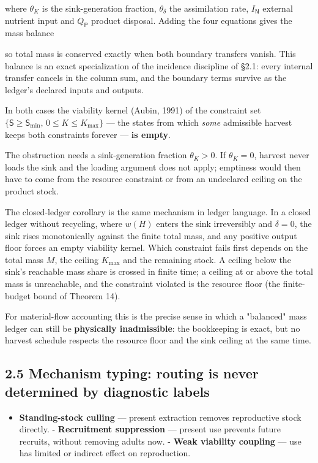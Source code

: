 \documentclass[11pt]{article}
\begin{document}
where \(\theta_K\) is the sink-generation fraction, \(\theta_\delta\) the assimilation rate, \(I_{\mathsf N}\) external nutrient input and \(Q_{\mathsf P}\) product disposal. Adding the four equations gives the mass balance

so total mass is conserved exactly when both boundary transfers vanish. This balance is an exact specialization of the incidence discipline of \S2.1: every internal transfer cancels in the column sum, and the boundary terms survive as the ledger's declared inputs and outputs.

In both cases the viability kernel (Aubin, 1991) of the constraint set \(\{\mathsf S\ge \mathsf S_{\min},\allowbreak{}\,\allowbreak{}0\le K\le K_{\max}\}\) --- the states from which \emph{some} admissible harvest keeps both constraints forever --- \textbf{is empty}.

The obstruction needs a sink-generation fraction \(\theta_K>0\). If \(\theta_K=0\), harvest never loads the sink and the loading argument does not apply; emptiness would then have to come from the resource constraint or from an undeclared ceiling on the product stock.

The closed-ledger corollary is the same mechanism in ledger language. In a closed ledger without recycling, where \(w(H)\) enters the sink irreversibly and \(\delta=0\), the sink rises monotonically against the finite total mass, and any positive output floor forces an empty viability kernel. Which constraint fails first depends on the total mass \(M\), the ceiling \(K_{\max}\) and the remaining stock. A ceiling below the sink's reachable mass share is crossed in finite time; a ceiling at or above the total mass is unreachable, and the constraint violated is the resource floor (the finite-budget bound of Theorem 14).

For material-flow accounting this is the precise sense in which a "balanced" mass ledger can still be \textbf{physically inadmissible}: the bookkeeping is exact, but no harvest schedule respects the resource floor and the sink ceiling at the same time.

\subsection*{2.5 Mechanism typing: routing is never determined by diagnostic labels}\label{25-mechanism-typing-routing-is-never-determined-by-diagnostic-labels}

\begin{itemize}\setlength{\itemsep}{2pt}
\item \textbf{Standing-stock culling} --- present extraction removes reproductive stock directly. - \textbf{Recruitment suppression} --- present use prevents future recruits, without removing adults now. - \textbf{Weak viability coupling} --- use has limited or indirect effect on reproduction.
\end{itemize}
\end{document}
